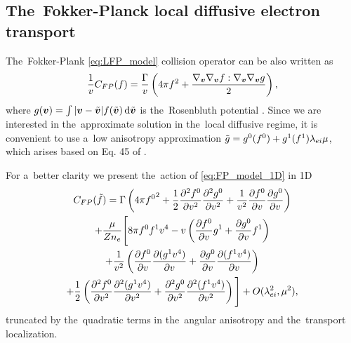 \subsection{The~Fokker-Planck local diffusive electron transport}
\label{sec:FPDiffusiveRegime}
\newcommand{\gt}{g}
\newcommand{\gM}{\gt_M}

The~Fokker-Plank \eqref{eq:LFP_model} collision operator can be also written as 
\cite{Shkarofsky_Particle_Kinetics_book_1966_24}
\begin{equation}
  \frac{1}{\vmag}C_{FP}(f) =  
  \frac{\Gamma}{\vmag} \left(4\pi f^2 
  + \frac{\gv\gv \ft : \gv\gv \gt}{2}\right) ,
  \label{eq:FP_model_1D}
\end{equation}
where $g(\boldsymbol{v}) = \int |\boldsymbol{v} - \tilde{\boldsymbol{v}}| f(\tilde{\boldsymbol{v}})\, \text{d}\tilde{\boldsymbol{v}}$ is 
the~Rosenbluth potential \cite{Rosenbluth_PR1957}. Since we are interested in 
the~approximate solution in the~local diffusive regime, it is convenient to
use a~low anisotropy approximation 
$\tilde{\gt} = \gt^0(f^0) + \gt^1(f^1) \mfpei \mu$, which arises based on 
Eq. 45 of \cite{Rosenbluth_PR1957}.

For a~better clarity we present the~action of \eqref{eq:FP_model_1D} in 1D
\begin{multline}
  C_{FP}(\tilde{f}) = 
  \Gamma\left(4\pi{\ft^0}^2 + 
  \frac{1}{2}\frac{\partial^2 \ft^0}{\partial \vmag^2}
  \frac{\partial^2 \gt^0}{\partial \vmag^2}
  + \frac{1}{\vmag^2}\pdv{\ft^0}{\vmag}\pdv{\gt^0}{\vmag} \right)
  \\
  + \frac{\mu}{\Zbar n_e}
  \Bigg[8\pi \ft^0 \ft^1\vmag^4 - \vmag\left(\pdv{\ft^0}{\vmag}\gt^1
  + \pdv{\gt^0}{\vmag}\ft^1\right) 
  \\
  + \frac{1}{\vmag^2}\left(\pdv{\ft^0}{\vmag}
  \pdv{(\gt^1\vmag^4)}{\vmag}
  + \pdv{\gt^0}{\vmag}\pdv{(\ft^1\vmag^4)}{\vmag}\right) \\
  + \frac{1}{2}\left(\frac{\partial^2 \ft^0}{\partial \vmag^2}
  \frac{\partial^2 (\gt^1\vmag^4)}{\partial \vmag^2}
  + \frac{\partial^2 \gt^0}{\partial \vmag^2} 
  \frac{\partial^2 (\ft^1\vmag^4)}{\partial \vmag^2}
  \right) \Bigg] + O(\mfpei^2, \mu^2) ,
  \label{eq:FP_truncation}
\end{multline}
truncated by the~quadratic terms in the~angular anisotropy and the~transport 
localization.

